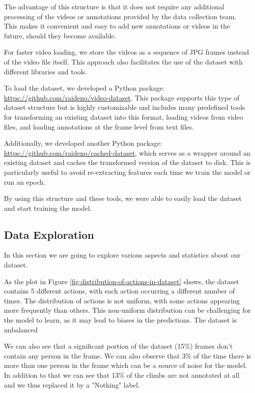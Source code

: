 The advantage of this structure is that it does not require any additional processing of the videos or annotations provided by the data collection team. This makes it convenient and easy to add new annotations or videos in the future, should they become available.

For faster video loading, we store the videos as a sequence of JPG frames instead of the video file itself. This approach also facilitates the use of the dataset with different libraries and tools.

To load the dataset, we developed a Python package: \href{https://github.com/raideno/video-dataset}{https://github.com/raideno/video-dataset}. This package supports this type of dataset structure but is highly customizable and includes many predefined tools for transforming an existing dataset into this format, loading videos from video files, and loading annotations at the frame level from text files.

Additionally, we developed another Python package: \href{https://github.com/raideno/cached-dataset}{https://github.com/raideno/cached-dataset}, which serves as a wrapper around an existing dataset and caches the transformed version of the dataset to disk. This is particularly useful to avoid re-extracting features each time we train the model or run an epoch.

By using this structure and these tools, we were able to easily load the dataset and start training the model.

\subsection{Data Exploration}

In this section we are going to explore various aspects and statistics about our dataset.

As the plot in Figure \ref{fig:distribution-of-actions-in-dataset} shows, the dataset contains 5 different actions, with each action occurring a different number of times. The distribution of actions is not uniform, with some actions appearing more frequently than others. This non-uniform distribution can be challenging for the model to learn, as it may lead to biases in the predictions. The dataset is unbalanced

We can also see that a significant portion of the dataset (15\%) frames don't contain any person in the frame. We can also observe that 3\% of the time there is more than one person in the frame which can be a source of noise for the model.
In addition to that we can see that 13\% of the climbs are not annotated at all and we thus replaced it by a "Nothing" label.

